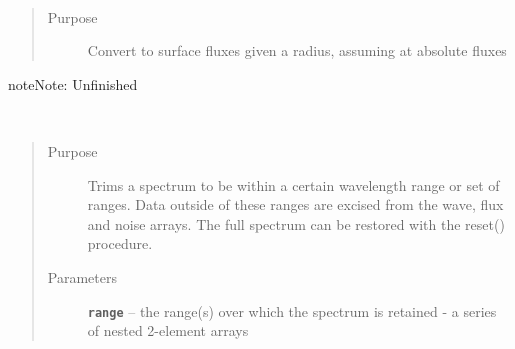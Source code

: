 \documentclass[letterpaper,10pt,english]{sphinxmanual}
\begin{document}
\begin{fulllineitems}
\begin{fulllineitems}
\begin{quote}
\begin{description}
\end{description}\end{quote}

\end{fulllineitems}


\begin{fulllineitems}
\label{api:splat.Spectrum.surface}~\begin{quote}\begin{description}
\item[{Purpose}] \leavevmode
Convert to surface fluxes given a radius, assuming at absolute fluxes

\end{description}\end{quote}

\begin{notice}{note}{Note:}
Unfinished
\end{notice}

\end{fulllineitems}


\begin{fulllineitems}
\label{api:splat.Spectrum.trim}~\begin{quote}\begin{description}
\item[{Purpose}] \leavevmode
Trims a spectrum to be within a certain wavelength range or set of ranges. Data outside of these ranges are excised from the wave, flux and noise arrays. The full spectrum can be restored with the reset() procedure.

\item[{Parameters}] \leavevmode
\textbf{\texttt{range}} -- the range(s) over which the spectrum is retained - a series of nested 2-element arrays


\end{description}
\end{quote}
\end{fulllineitems}
\end{fulllineitems}
\end{document}
